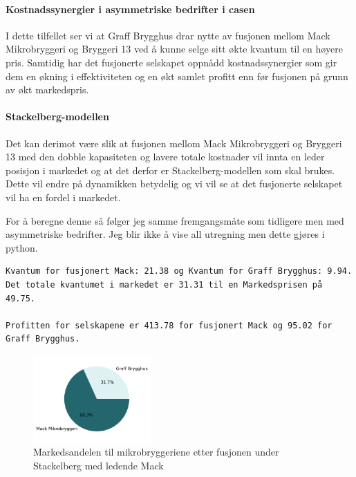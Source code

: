 \documentclass[
  12pt,
  a4paper,
  DIV=11,
  numbers=noendperiod]{scrartcl}
\let\oldparagraph\paragraph
\renewcommand{\paragraph}[1]{\oldparagraph{#1}\mbox{}}
\begin{document}
\paragraph{Kostnadssynergier i asymmetriske bedrifter i
casen}\label{kostnadssynergier-i-asymmetriske-bedrifter-i-casen}

I dette tilfellet ser vi at Graff Brygghus drar nytte av fusjonen mellom
Mack Mikrobryggeri og Bryggeri 13 ved å kunne selge sitt økte kvantum
til en høyere pris. Samtidig har det fusjonerte selskapet oppnådd
kostnadssynergier som gir dem en økning i effektiviteten og en økt
samlet profitt enn før fusjonen på grunn av økt markedspris.

\paragraph{Stackelberg-modellen}\label{stackelberg-modellen}

Det kan derimot være slik at fusjonen mellom Mack Mikrobryggeri og
Bryggeri 13 med den dobble kapasiteten og lavere totale kostnader vil
innta en leder posisjon i markedet og at det derfor er
Stackelberg-modellen som skal brukes. Dette vil endre på dynamikken
betydelig og vi vil se at det fusjonerte selskapet vil ha en fordel i
markedet.

For å beregne denne så følger jeg samme fremgangsmåte som tidligere men
med asymmetriske bedrifter. Jeg blir ikke å vise all utregning men dette
gjøres i python.

\begin{verbatim}
Kvantum for fusjonert Mack: 21.38 og Kvantum for Graff Brygghus: 9.94. 
Det totale kvantumet i markedet er 31.31 til en Markedsprisen på 49.75.

Profitten for selskapene er 413.78 for fusjonert Mack og 95.02 for Graff Brygghus.
\end{verbatim}

\begin{figure}[!h]
\centering
\includegraphics[width=0.4\textwidth]{dokumentobjekter/figurer/markedsandel_mikrobryggerier_fusjon_stackel.png}
\caption{Markedsandelen til mikrobryggeriene etter fusjonen under Stackelberg med ledende Mack}
\label{fig:markedsandel_etter_stackel}
\end{figure}
\end{document}
